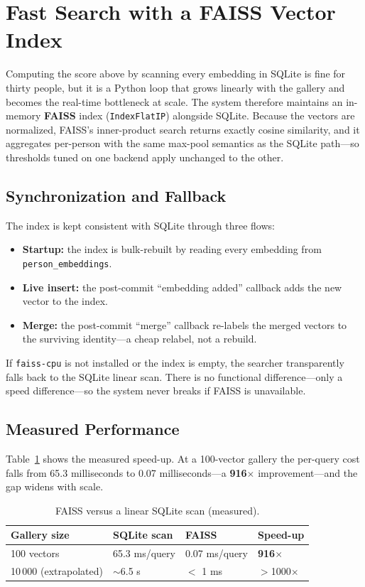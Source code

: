 \documentclass[12pt]{report}
\begin{document}
\section{Fast Search with a FAISS Vector Index}
Computing the score above by scanning every embedding in SQLite is fine for thirty people, but it is a Python loop that grows linearly with the gallery and becomes the real-time bottleneck at scale. The system therefore maintains an in-memory \textbf{FAISS} index (\texttt{IndexFlatIP}) alongside SQLite. Because the vectors are normalized, FAISS's inner-product search returns exactly cosine similarity, and it aggregates per-person with the same max-pool semantics as the SQLite path---so thresholds tuned on one backend apply unchanged to the other.

\subsection{Synchronization and Fallback}
The index is kept consistent with SQLite through three flows:
\begin{itemize}
    \item \textbf{Startup:} the index is bulk-rebuilt by reading every embedding from \texttt{person\_embeddings}.
    \item \textbf{Live insert:} the post-commit ``embedding added'' callback adds the new vector to the index.
    \item \textbf{Merge:} the post-commit ``merge'' callback re-labels the merged vectors to the surviving identity---a cheap relabel, not a rebuild.
\end{itemize}
If \texttt{faiss-cpu} is not installed or the index is empty, the searcher transparently falls back to the SQLite linear scan. There is no functional difference---only a speed difference---so the system never breaks if FAISS is unavailable.

\subsection{Measured Performance}
Table~\ref{tab:faiss_perf} shows the measured speed-up. At a 100-vector gallery the per-query cost falls from 65.3 milliseconds to 0.07 milliseconds---a \textbf{916$\times$} improvement---and the gap widens with scale.

\begin{table}[H]
\centering
\begin{tabular}{|l|l|l|l|}
\hline
\textbf{Gallery size} & \textbf{SQLite scan} & \textbf{FAISS} & \textbf{Speed-up} \\
\hline
100 vectors & 65.3 ms/query & 0.07 ms/query & \textbf{916$\times$} \\
\hline
10\,000 (extrapolated) & $\sim$6.5 s & $<$ 1 ms & $>$1000$\times$ \\
\hline
\end{tabular}
\caption{FAISS versus a linear SQLite scan (measured).}
\label{tab:faiss_perf}
\end{table}
\end{document}
